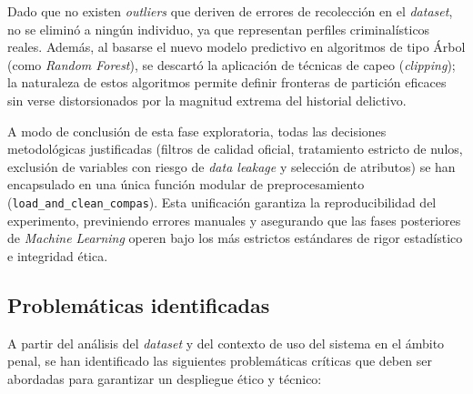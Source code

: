 \documentclass[11pt,a4paper]{article}
\begin{document}
Dado que no existen \textit{outliers} que deriven de errores de recolección en el \textit{dataset}, no se eliminó a ningún individuo, ya que representan perfiles criminalísticos reales. Además, al basarse el nuevo modelo predictivo en algoritmos de tipo Árbol (como \textit{Random Forest}), se descartó la aplicación de técnicas de capeo (\textit{clipping}); la naturaleza de estos algoritmos permite definir fronteras de partición eficaces sin verse distorsionados por la magnitud extrema del historial delictivo.

A modo de conclusión de esta fase exploratoria, todas las decisiones metodológicas justificadas (filtros de calidad oficial, tratamiento estricto de nulos, exclusión de variables con riesgo de \textit{data leakage} y selección de atributos) se han encapsulado en una única función modular de preprocesamiento (\texttt{load\_and\_clean\_compas}). Esta unificación garantiza la reproducibilidad del experimento, previniendo errores manuales y asegurando que las fases posteriores de \textit{Machine Learning} operen bajo los más estrictos estándares de rigor estadístico e integridad ética.

\subsection{Problemáticas identificadas}

A partir del análisis del \textit{dataset} y del contexto de uso del sistema en el ámbito penal, se han identificado las siguientes problemáticas críticas que deben ser abordadas para garantizar un despliegue ético y técnico:
\end{document}
